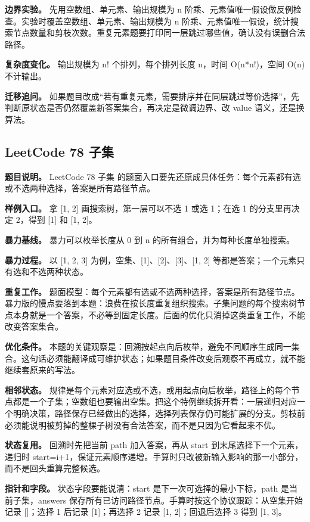 \textbf{边界实验。} 先用空数组、单元素、输出规模为 n 阶乘、元素值唯一假设做反例检查。实验时覆盖空数组、单元素、输出规模为 n 阶乘、元素值唯一假设，统计搜索节点数量和剪枝次数。重复元素题要打印同一层跳过哪些值，确认没有误删合法路径。

\textbf{复杂度变化。} 输出规模为 n! 个排列，每个排列长度 n，时间 O(n*n!)，空间 O(n) 不计输出。

\textbf{迁移追问。} 如果题目改成“若有重复元素，需要排序并在同层跳过等价选择”，先判断原状态是否仍然覆盖新答案集合，再决定是微调边界、改 value 语义，还是换算法。

\subsection{LeetCode 78 子集}

\textbf{题目说明。} LeetCode 78 子集 的题面入口要先还原成具体任务：每个元素都有选或不选两种选择，答案是所有路径节点。

\textbf{样例入口。} 拿 [1, 2] 画搜索树，第一层可以不选 1 或选 1；在选 1 的分支里再决定 2，得到 [1] 和 [1, 2]。

\textbf{暴力基线。} 暴力可以枚举长度从 0 到 n 的所有组合，并为每种长度单独搜索。

\textbf{暴力过程。} 以 [1, 2, 3] 为例，空集、[1]、[2]、[3]、[1, 2] 等都是答案；一个元素只有选和不选两种状态。

\textbf{重复工作。} 题面模型：每个元素都有选或不选两种选择，答案是所有路径节点。暴力版的慢点要落到本题：浪费在按长度重复组织搜索。子集问题的每个搜索树节点本身就是一个答案，不必等到固定长度。后面的优化只消掉这类重复工作，不能改变答案集合。

\textbf{优化条件。} 本题的关键观察是：回溯按起点向后枚举，避免不同顺序生成同一集合。这句话必须能翻译成可维护状态；如果题目条件改变后观察不再成立，就不能继续套原来的写法。

\textbf{相邻状态。} 规律是每个元素对应选或不选，或用起点向后枚举，路径上的每个节点都是一个子集；空数组也要输出空集。把这个特例继续拆开看：一层递归对应一个明确决策，路径保存已经做出的选择，选择列表保存仍可能扩展的分支。剪枝前必须能说明被剪掉的整棵子树没有合法答案，而不是只因为它看起来不优。

\textbf{状态复用。} 回溯时先把当前 path 加入答案，再从 start 到末尾选择下一个元素，递归时 start=i+1，保证元素顺序递增。手算时只改被新输入影响的那一小部分，而不是回头重算完整候选。

\textbf{指针和字段。} 状态字段要能说清：start 是下一次可选择的最小下标，path 是当前子集，answers 保存所有已访问路径节点。手算时按这个协议跟踪：从空集开始记录 []；选择 1 后记录 [1]；再选择 2 记录 [1, 2]；回退后选择 3 得到 [1, 3]。

